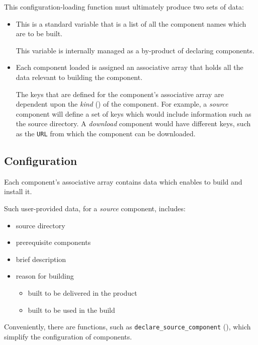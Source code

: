 This configuration-loading function must ultimately produce two sets
of data:

\begin{itemize}
\item \lmsbwcomponents

  This is a standard \gnumake variable that is a list of all the
  component names which are to be built.

  This variable is internally managed as a by-product of declaring
  components.

\item {}

  Each component loaded is assigned an associative array that holds
  all the data relevant to building the component.

  The keys that are defined for the component's associative array are
  dependent upon the \emph{kind} () of the
  component.  For example, a \emph{source} component will define a set
  of keys which would include information such as the source
  directory.  A \emph{download} component would have different keys,
  such as the \texttt{URL} from which the component can be downloaded.
\end{itemize}


\subsection{ Configuration}

Each component's associative array contains data which enables \lmsbw
to build and install it.

Such user-provided data, for a \emph{source} component, includes:

\begin{itemize}
\item source directory
\item prerequisite components
\item brief description
\item reason for building
  \begin{itemize}
  \item built to be delivered in the product
  \item built to be used in the build
  \end{itemize}
\end{itemize}

Conveniently, there are \lmsbw functions, such as
\texttt{declare\_source\_component}
(), which simplify the
configuration of components.
